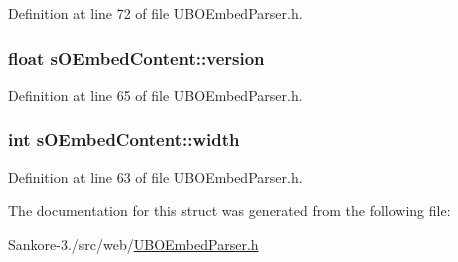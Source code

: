 Definition at line 72 of file U\-B\-O\-Embed\-Parser.\-h.

\hypertarget{structs_o_embed_content_a5df8726e71132a8b084c88b4ee902512}{
\subsubsection[{version}]{\setlength{\rightskip}{0pt plus 5cm}float s\-O\-Embed\-Content\-::version}}\label{d9/d62/structs_o_embed_content_a5df8726e71132a8b084c88b4ee902512}


Definition at line 65 of file U\-B\-O\-Embed\-Parser.\-h.

\hypertarget{structs_o_embed_content_a053703ffaa9305e87a159ffea87aaf4a}{
\subsubsection[{width}]{\setlength{\rightskip}{0pt plus 5cm}int s\-O\-Embed\-Content\-::width}}\label{d9/d62/structs_o_embed_content_a053703ffaa9305e87a159ffea87aaf4a}


Definition at line 63 of file U\-B\-O\-Embed\-Parser.\-h.



The documentation for this struct was generated from the following file\-:\begin{DoxyCompactItemize}
\item 
Sankore-\/3./src/web/\hyperlink{_u_b_o_embed_parser_8h}{U\-B\-O\-Embed\-Parser.\-h}\end{DoxyCompactItemize}
